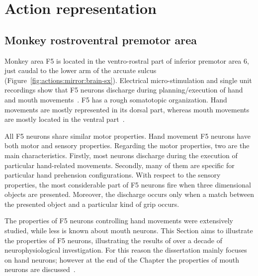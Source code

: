 \chapter{Action representation}
\label{ch:actions}

\section{Monkey rostroventral premotor area}
\label{sec:actions:F5}
Monkey area F5 is located in the ventro-rostral part of inferior premotor area 
6, just caudal to the lower arm of the arcuate sulcus 
(Figure~\ref{fig:actions:mirror:brain-sx}).
Electrical micro-stimulation and single unit recordings show that F5 neurons
discharge during planning/execution of hand and mouth
movements~\citep{rizzolatti.etal:1988}.
F5 has a rough somatotopic organization. 
Hand movements are mostly represented in its dorsal part, whereas mouth
movements are mostly located in the ventral
part~\citep{rizzolatti.etal:1996,rizzolatti.fadiga:1998}.

All F5 neurons share similar motor properties. 
Hand movement F5 neurons have both motor and sensory properties.
Regarding the motor properties, two are the main characteristics. 
Firstly, most neurons discharge during the execution of particular hand-related
movements. Secondly, many of them are specific for particular hand prehension
configurations.
With respect to the sensory properties, the most considerable part of F5 neurons
fire when three dimensional objects are presented.
Moreover, the discharge occurs only when a match between the presented object
and a particular kind of grip occurs.

The properties of F5 neurons controlling hand movements were extensively
studied, while less is known about mouth neurons.
This Section aims to illustrate the properties of F5 neurons, illustrating 
the results of over a decade of neurophysiological investigation. 
For this reason the dissertation mainly focuses on hand neurons; however at the
end of the Chapter the properties of mouth neurons are
discussed~\citep{ferrari.etal:2003}.


